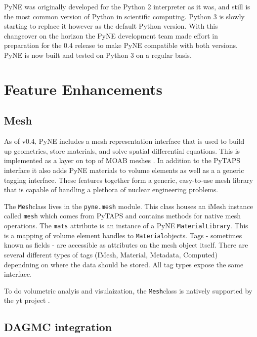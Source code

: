\documentclass{anstrans}
\newcommand{\Mesh}{\texttt{Mesh}}
\newcommand{\Material}{\texttt{Material}}
\begin{document}
PyNE was originally developed for the Python 2 interpreter as it was, and still is the most common version of Python in scientific computing. Python 3 is slowly starting to replace it however as the default Python version. With this changeover on the horizon the PyNE development team made effort in preparation for the 0.4 release to make PyNE compatible with both versions. PyNE is now built and tested on Python 3 on a regular basis.

\section{Feature Enhancements}

\subsection{Mesh}

As of v0.4, PyNE includes a mesh representation interface that is used to 
build up geometries, store materials, and solve spatial differential equations.
This is implemented as a layer on top of MOAB meshes \cite{tautges_moab:_2004}.
In addition to the PyTAPS interface \cite{pytaps} it also adds PyNE materials to 
volume elements as well as a a generic tagging interface. These features together 
form a generic, easy-to-use mesh library that is capable of handling a plethora
of nuclear engineering problems.

The \Mesh class lives in the \texttt{pyne.mesh} module. This class houses an 
iMesh instance called \texttt{mesh} which comes from PyTAPS and contains 
methods for native mesh operations. The \texttt{mats} attribute is an 
instance of a PyNE \texttt{MaterialLibrary}. This is a mapping of volume 
element handles to \Material objects. Tags - sometimes known as fields - are 
accessible as attributes on the mesh object itself. There are several different types
of tags (IMesh, Material, Metadata, Computed) dependning on where the data should
be stored.  All tag types expose the same interface. 

To do volumetric analyis and visulaization, the \Mesh class is natively supported 
by the yt project \cite{2011ApJS..192....9T}.


\subsection{DAGMC integration}
\end{document}
